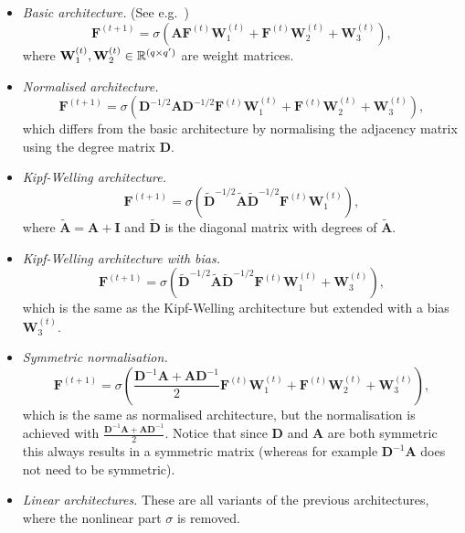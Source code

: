 \begin{itemize}
 \item \emph{Basic architecture.} (See e.g.~\cite{hyl17})
\begin{equation}\label{architecture:basic}
  \mathbf{F}^{(t+1)} = \sigma\left(
   \mathbf{AF}^{(t)}\mathbf{W}_1^{(t)} +
    \mathbf{F}^{(t)}\mathbf{W}_2^{(t)} +
    \mathbf{W}_3^{(t)}
  \right),
\end{equation}
where $\mathbf{W}_1^{(t)}, \mathbf{W}_2^{(t)} \in \mathbb{R}^{(q \times q')}$ are weight matrices.
\item \emph{Normalised architecture.} 
\begin{equation}\label{architecture:normalised}
  \mathbf{F}^{(t+1)} = \sigma\left(
   \mathbf{D}^{-1/2}\mathbf{AD}^{-1/2}\mathbf{F}^{(t)}\mathbf{W}_1^{(t)} +
    \mathbf{F}^{(t)}\mathbf{W}_2^{(t)} +
    \mathbf{W}_3^{(t)}
  \right),
\end{equation}
which differs from the basic architecture by normalising the adjacency matrix using the degree matrix $\mathbf{D}$.
\item \emph{Kipf-Welling architecture.}
\begin{equation}\label{architecture:kipf}
  \mathbf{F}^{(t+1)} = \sigma\left(
   \tilde{\mathbf{D}}^{-1/2}\tilde{\mathbf{A}}\tilde{\mathbf{D}}^{-1/2}\mathbf{F}^{(t)}\mathbf{W}_1^{(t)}
  \right),
\end{equation}
where $\tilde{\mathbf{A}} = \mathbf{A} + \mathbf{I}$ and $\tilde{\mathbf{D}}$ is the diagonal matrix with degrees of $\tilde{\mathbf{A}}$.
\item \emph{Kipf-Welling architecture with bias.}
\begin{equation}\label{architecture:kipfbiased}
  \mathbf{F}^{(t+1)} = \sigma\left(
   \tilde{\mathbf{D}}^{-1/2}\tilde{\mathbf{A}}\tilde{\mathbf{D}}^{-1/2}\mathbf{F}^{(t)}\mathbf{W}_1^{(t)} +
    \mathbf{W}_3^{(t)}
  \right),
\end{equation}
which is the same as the Kipf-Welling architecture but extended with a bias $\mathbf{W}_3^{(t)}$.
\item \emph{Symmetric normalisation.}
\begin{equation}\label{architecture:symmetric}
  \mathbf{F}^{(t+1)} = \sigma\left(
   \frac{\mathbf{D}^{-1}\mathbf{A} + \mathbf{AD}^{-1}}{2} \mathbf{F}^{(t)}\mathbf{W}_1^{(t)} +
    \mathbf{F}^{(t)}\mathbf{W}_2^{(t)} +
    \mathbf{W}_3^{(t)}
  \right),
\end{equation}
which is the same as normalised architecture, but the normalisation is achieved with $\frac{\mathbf{D}^{-1}\mathbf{A} + \mathbf{AD}^{-1}}{2}$. Notice that since $\mathbf{D}$ and $\mathbf{A}$ are both symmetric this always results in a symmetric matrix (whereas for example $\mathbf{D}^{-1}\mathbf{A}$ does not need to be symmetric).
\item \emph{Linear architectures.} These are all variants of the previous architectures, where the nonlinear part $\sigma$ is removed.
\end{itemize}

